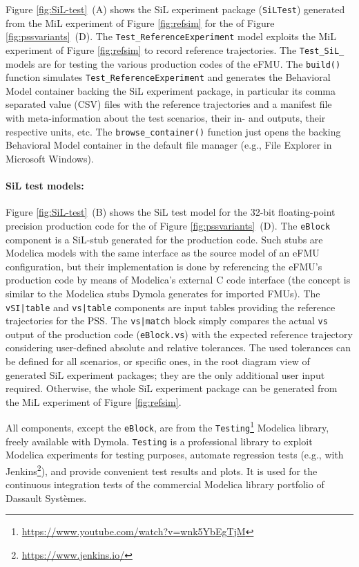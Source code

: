 Figure \ref{fig:SiL-test}~(A) shows the SiL experiment package (\texttt{SiLTest}) generated from the MiL experiment of Figure \ref{fig:refsim} for the \controller{} of Figure \ref{fig:pssvariants}~(D). The \texttt{Test\_ReferenceExperiment} model exploits the MiL experiment of Figure \ref{fig:refsim} to record reference trajectories. The \texttt{Test\_SiL\_} models are for testing the various production codes of the eFMU. The \texttt{build()} function simulates \texttt{Test\_ReferenceExperiment} and generates the Behavioral Model container backing the SiL experiment package, in particular its comma separated value (CSV) files with the reference trajectories and a manifest file with meta-information about the test scenarios, their in- and outputs, their respective units, etc. The \texttt{browse\_container()} function just opens the backing Behavioral Model container in the default file manager (e.g., File Explorer in Microsoft Windows).

\paragraph{SiL test models:} Figure \ref{fig:SiL-test}~(B) shows the SiL test model for the 32-bit floating-point precision production code for the \controller{} of Figure \ref{fig:pssvariants}~(D). The \texttt{eBlock} component is a SiL-stub generated for the production code. Such stubs are Modelica models with the same interface as the source model of an eFMU configuration, but their implementation is done by referencing the eFMU's production code by means of Modelica's external C code interface (the concept is similar to the Modelica stubs Dymola generates for imported FMUs). The \texttt{\textquotesingle{}vSI|table\textquotesingle{}} and \texttt{\textquotesingle{}vs|table\textquotesingle{}} components are input tables providing the reference trajectories for the PSS. The \texttt{\textquotesingle{}vs|match\textquotesingle{}} block simply compares the actual \texttt{vs} output of the production code (\texttt{eBlock.vs}) with the expected reference trajectory considering user-defined absolute and relative tolerances. The used tolerances can be defined for all scenarios, or specific ones, in the root diagram view of generated SiL experiment packages; they are the only additional user input required. Otherwise, the whole SiL experiment package can be generated from the MiL experiment of Figure \ref{fig:refsim}.

All components, except the \texttt{eBlock}, are from the \texttt{Testing}\footnote{\tiny{\url{https://www.youtube.com/watch?v=wnk5YbEgTjM}}} Modelica library, freely available with Dymola. \texttt{Testing} is a professional library to exploit Modelica experiments for testing purposes, automate regression tests (e.g., with Jenkins\footnote{\tiny{\url{https://www.jenkins.io/}}}), and provide convenient test results and plots. It is used for the continuous integration tests of the commercial Modelica library portfolio of Dassault Systèmes.

